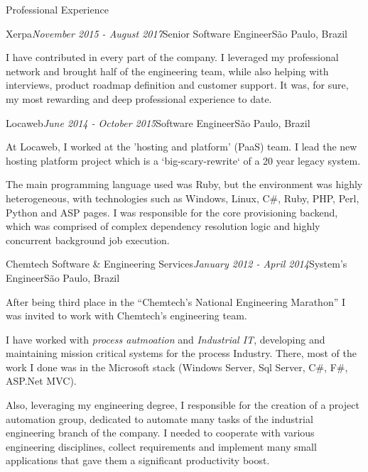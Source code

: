 \documentclass{resume} %
\begin{document}
\begin{rSection}{Professional Experience}
\begin{rSubsection}{Xerpa}{\em November 2015 - August 2017}{Senior Software Engineer}{São
      Paulo, Brazil}
  \item I have contributed in every part of the company. I leveraged my
    professional network and brought half of the engineering team, while also
    helping with interviews, product roadmap definition and customer support. It
    was, for sure, my most rewarding and deep professional experience to date.
  \end{rSubsection}

  \begin{rSubsection}{Locaweb}{\em June 2014 - October 2015}{Software Engineer}{São
      Paulo, Brazil}

  \item At Locaweb, I worked at the 'hosting and platform' (PaaS) team. I lead
    the new hosting platform project which is a `big-scary-rewrite` of a 20 year
    legacy system.

  \item The main programming language used was Ruby, but the environment was
    highly heterogeneous, with technologies such as Windows, Linux, C\#, Ruby,
    PHP, Perl, Python and ASP pages. I was responsible for the core provisioning
    backend, which was comprised of complex dependency resolution logic and
    highly concurrent background job execution.
  \end{rSubsection}

  \begin{rSubsection}{Chemtech Software \& Engineering Services}{\em January 2012 -
      April 2014}{System's Engineer}{São Paulo, Brazil}

  \item After being third place in the ``Chemtech's National Engineering
    Marathon'' I was invited to work with Chemtech's engineering team.

  \item I have worked with {\em process autmoation} and {\em Industrial IT},
    developing and maintaining mission critical systems for the process
    Industry. There, most of the work I done was in the Microsoft stack (Windows
    Server, Sql Server, C\#, F\#, ASP.Net MVC).

  \item Also, leveraging my engineering degree, I responsible for the creation
    of a project automation group, dedicated to automate many tasks of the
    industrial engineering branch of the company. I needed to cooperate with
    various engineering disciplines, collect requirements and implement many
    small applications that gave them a significant productivity boost.
  \end{rSubsection}
\end{rSection}
\end{document}
